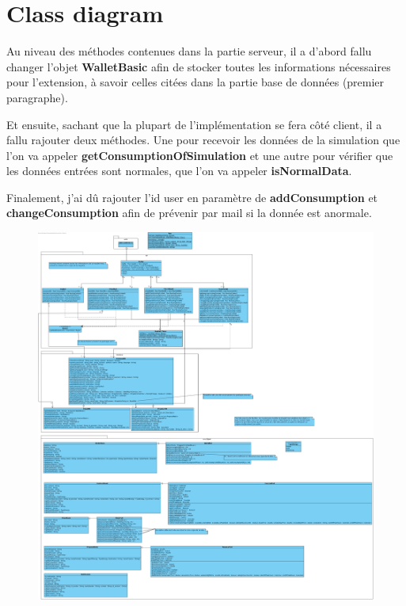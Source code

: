 \section{Class diagram}

\begin{flushleft}
Au niveau des méthodes contenues dans la partie serveur, il a d'abord fallu changer l'objet \textbf{WalletBasic} afin de stocker toutes les informations nécessaires pour l'extension, à savoir celles citées dans la partie base de données (premier paragraphe).
\end{flushleft}

\begin{flushleft}
Et ensuite, sachant que la plupart de l'implémentation se fera côté client, il a fallu rajouter deux méthodes. Une pour recevoir les données de la simulation que l'on va appeler \textbf{getConsumptionOfSimulation} et une autre pour vérifier que les données entrées sont normales, que l'on va appeler \textbf{isNormalData}.
\end{flushleft}

\begin{flushleft}
Finalement, j'ai dû rajouter l'id user en paramètre de \textbf{addConsumption} et \textbf{changeConsumption} afin de prévenir par mail si la donnée est anormale.
\end{flushleft}

\begin{figure}[h]
\centering
\includegraphics[width=1.3\textwidth]{extension-adrien/ClassDiagram/img/classDiagram.png}
\end{figure}

